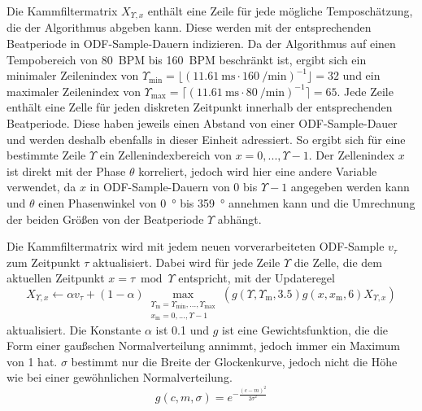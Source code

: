 {{{			%
			Die Kammfiltermatrix $X_{\Upsilon, x}$ enthält eine Zeile für jede mögliche Temposchätzung, die der Algorithmus abgeben kann.
			Diese werden mit der entsprechenden Beatperiode in ODF-Sample-Dauern indizieren.
			Da der Algorithmus auf einen Tempobereich von \SI{80}{\ac{BPM}} bis \SI{160}{\ac{BPM}} beschränkt ist,
				ergibt sich ein minimaler Zeilenindex von
				$\Upsilon_{\text{min}} = \lfloor(\SI{11.61}{\milli\second} \cdot \SI{160}{\per\minute})^{-1}\rfloor = 32$
				und ein maximaler Zeilenindex von
				$\Upsilon_{\text{max}} = \lceil(\SI{11.61}{\milli\second} \cdot \SI{80}{\per\minute})^{-1}\rceil = 65$.
			Jede Zeile enthält eine Zelle für jeden diskreten Zeitpunkt innerhalb der entsprechenden Beatperiode.
			Diese haben jeweils einen Abstand von einer ODF-Sample-Dauer
				und werden deshalb ebenfalls in dieser Einheit adressiert.
			So ergibt sich für eine bestimmte Zeile $\Upsilon$ ein Zellenindexbereich von $x = 0, ..., \Upsilon - 1$.
			Der Zellenindex $x$ ist direkt mit der Phase $\theta$ korreliert,
				jedoch wird hier eine andere Variable verwendet,
				da $x$ in ODF-Sample-Dauern von $0$ bis $\Upsilon - 1$ angegeben werden kann
				und $\theta$ einen Phasenwinkel von \SI{0}{\degree} bis \SI{359}{\degree} annehmen kann
				und die Umrechnung der beiden Grö{\ss}en von der Beatperiode $\Upsilon$ abhängt.

			Die Kammfiltermatrix wird mit jedem neuen vorverarbeiteten ODF-Sample $v_\tau$ zum Zeitpunkt $\tau$ aktualisiert.
			Dabei wird für jede Zeile $\Upsilon$ die Zelle,
				die dem aktuellen Zeitpunkt $x = \tau \bmod \Upsilon$ entspricht,
				mit der Updateregel
				\begin{equation}
					X_{\Upsilon, x} \leftarrow
						\alpha v_\tau +
						(1 - \alpha) \max_{
							\substack{
								\Upsilon_\text{m} = \Upsilon_{\text{min}}, ..., \Upsilon_{\text{max}} \\
								x_\text{m} = 0, ..., \Upsilon - 1
							}
						}
						(g(\Upsilon, \Upsilon_\text{m}, 3.5) g(x, x_\text{m}, 6) X_{\Upsilon, x})
				\end{equation}
				aktualisiert.
			Die Konstante $\alpha$ ist \num{0.1}
				und $g$ ist eine Gewichtsfunktion,
				die die Form einer gau{\ss}schen Normalverteilung annimmt,
				jedoch immer ein Maximum von \num{1} hat.
			$\sigma$ bestimmt nur die Breite der Glockenkurve,
				jedoch nicht die Höhe wie bei einer gewöhnlichen Normalverteilung.
			\begin{equation}
				g(c, m, \sigma) = e^{-\frac{(c - m)^2}{2\sigma^2}}
			\end{equation}

}}}
